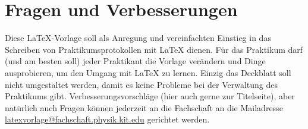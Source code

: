 \section{Fragen und Verbesserungen}
Diese LaTeX-Vorlage soll als Anregung und vereinfachten Einstieg in das Schreiben von Praktikumsprotokollen mit LaTeX dienen. Für das Praktikum darf (und am besten soll) jeder Praktikant die Vorlage verändern und Dinge ausprobieren, um den Umgang mit LaTeX zu lernen. Einzig das Deckblatt soll nicht umgestaltet werden, damit es keine Probleme bei der Verwaltung des Praktikums gibt. Verbesserungsvorschläge (hier auch gerne zur Titelseite), aber natürlich auch Fragen können jederzeit an die Fachschaft an die Mailadresse \href{mailto:latexvorlage@fachschaft.physik.kit.edu}{latexvorlage@fachschaft.physik.kit.edu} gerichtet werden.